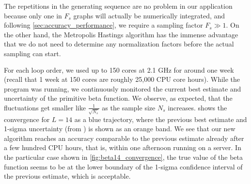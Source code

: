 \documentclass[11pt]{scrartcl}
\numberwithin{equation}{section}
\begin{document}
The repetitions in the generating sequence are no problem in our application because only one in $F_s$ graphs will actually be numerically integrated, and following \cref{sec:accuracy_performance}, we require a sampling factor $F_s \gg 1$. On the other hand, the Metropolis Hastings algorithm has the immense advantage that we do not need to determine any normalization factors before the actual sampling can start. 


For each loop order, we used up to 150 cores at 2.1 GHz for around one week (recall that 1 week at 150 cores are roughly 25,000 CPU core hours). While the program was running, we continuously monitored the current best estimate and uncertainty of the primitive beta function. We observe, as expected, that the fluctuations get smaller like $\frac{1}{\sqrt {N_s}}$ as the sample size $N_s$ increases.   shows the convergence for $L=14$ as a blue trajectory, where the previous best estimate and 1-sigma uncertainty (from \cite{balduf_statistics_2023}) is shown as an orange band. We see that our new algorithm reaches an accuracy comparable to the previous estimate already after a few hundred CPU hours, that is, within one afternoon running on a server. In the particular case shown in \cref{fig:beta14_convergence}, the true value of the beta function seems to be at the lower boundary of the 1-sigma confidence interval of the previous estimate, which is acceptable. 
\end{document}
